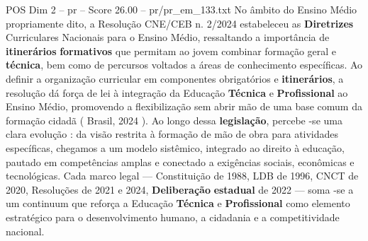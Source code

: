 \begin{textsample}{POS Dim 2 – pr – Score 26.00 – pr/pr\_em\_133.txt}
No âmbito do Ensino Médio propriamente dito, a Resolução CNE/CEB n. 2/2024 estabeleceu as \textbf{Diretrizes} Curriculares Nacionais para o Ensino Médio, ressaltando a importância de \textbf{itinerários} \textbf{formativos} que permitam ao jovem combinar formação geral e \textbf{técnica}, bem como de percursos voltados a áreas de conhecimento específicas.
Ao definir a organização curricular em componentes obrigatórios e \textbf{itinerários}, a resolução dá força de lei à integração da Educação \textbf{Técnica} e \textbf{Profissional} ao Ensino Médio, promovendo a flexibilização sem abrir mão de uma base comum da formação cidadã ( Brasil, 2024 ).
Ao longo dessa \textbf{legislação}, percebe -se uma clara evolução : da visão restrita à formação de mão de obra para atividades específicas, chegamos a um modelo sistêmico, integrado ao direito à educação, pautado em competências amplas e conectado a exigências sociais, econômicas e tecnológicas.
Cada marco legal — Constituição de 1988, LDB de 1996, CNCT de 2020, Resoluções de 2021 e 2024, \textbf{Deliberação} \textbf{estadual} de 2022 — soma -se a um continuum que reforça a Educação \textbf{Técnica} e \textbf{Profissional} como elemento estratégico para o desenvolvimento humano, a cidadania e a competitividade nacional.

\end{textsample}

